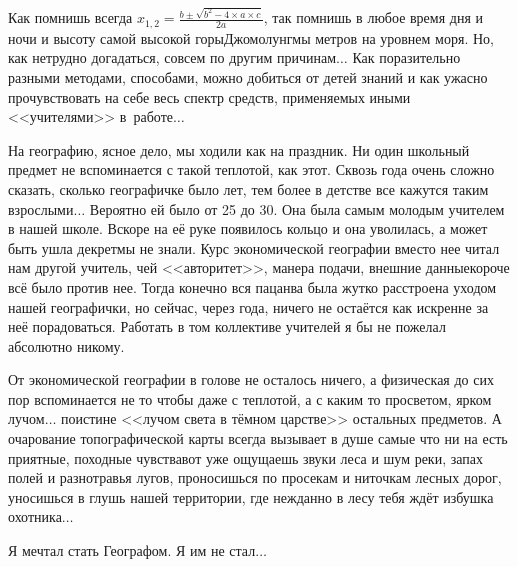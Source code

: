 Как помнишь всегда ${x_{1,2}= \frac{b\pm \sqrt{b^2-4\times a\times c}}{2a}}$, так помнишь в любое время дня и ночи и высоту самой высокой горы\mdash Джомолунгмы метров на уровнем моря. Но, как нетрудно догадаться, совсем по другим причинам$\ldots$ Как поразительно разными методами, способами, можно добиться от детей знаний и как ужасно прочувствовать на себе весь спектр средств, применяемых иными <<учителями>> в~работе$\ldots$ 

На географию, ясное дело, мы ходили как на праздник. Ни один школьный предмет не вспоминается с такой теплотой, как этот. Сквозь года очень сложно сказать, сколько географичке было лет, тем более в детстве все кажутся таким взрослыми$\ldots$ Вероятно ей было от 25 до 30. Она была самым молодым учителем в нашей школе. Вскоре на её руке появилось кольцо и она уволилась, а может быть ушла декрет\mdash мы не знали. Курс экономической географии вместо нее читал нам другой учитель, чей <<авторитет>>, манера подачи, внешние данные\mdash короче всё было против нее. Тогда конечно вся пацанва была жутко расстроена уходом нашей географички, но сейчас, через года, ничего не остаётся как искренне за неё порадоваться. Работать в том коллективе учителей я бы не пожелал абсолютно никому. 

От экономической географии в голове не осталось ничего, а физическая до сих пор вспоминается не то чтобы даже с теплотой, а с каким то просветом, ярком лучом$\ldots$ поистине <<лучом света в тёмном царстве>> остальных предметов. А очарование топографической карты всегда вызывает в душе самые что ни на есть приятные, походные чувства\mdash вот уже ощущаешь звуки леса и шум реки, запах полей и разнотравья лугов, проносишься по просекам и ниточкам лесных дорог, уносишься в глушь нашей территории, где нежданно в лесу тебя ждёт избушка охотника$\ldots$

Я мечтал стать Географом. Я им не стал$\ldots$
